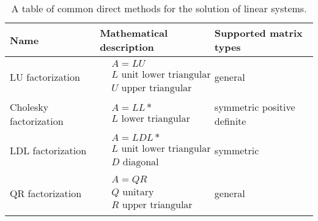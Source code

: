 \begin{table}
\begin{center}
\begin{tabular}{lll}
Name & Mathematical description & Supported matrix types \\
\midrule
LU factorization & 
    $\begin{aligned}
        &A = LU\\[-0.4em]
        &L \text{ unit lower triangular}\\[-0.4em]
        &U \text{ upper triangular}
    \end{aligned}$ &
general \\[1.5em]
Cholesky factorization &
    $\begin{aligned}
        &A = LL*\\[-0.4em]
        &L \text{ lower triangular}
    \end{aligned}$ &
symmetric positive definite \\[1em]
LDL factorization &
    $\begin{aligned}
        &A = LDL*\\[-0.4em]
        &L \text{ unit lower triangular}\\[-0.4em]
        &D \text{ diagonal}
    \end{aligned}$ &
symmetric \\[1.5em]
QR factorization &
    $\begin{aligned}
        &A = QR\\[-0.4em]
        &Q \text{ unitary}\\[-0.4em]
        &R \text{ upper triangular}
    \end{aligned}$ &
general 
\end{tabular}
\end{center}
\caption{A table of common direct methods for the solution of linear systems.}
\label{introduction:tab:direct-methods}
\end{table}

